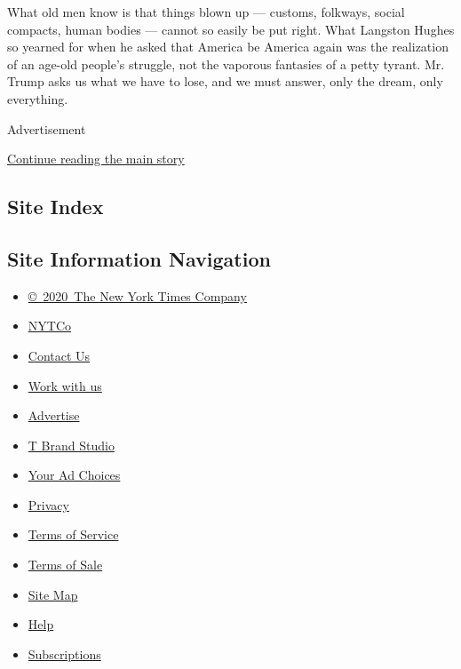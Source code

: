 What old men know is that things blown up --- customs, folkways, social
compacts, human bodies --- cannot so easily be put right. What Langston
Hughes so yearned for when he asked that America be America again was
the realization of an age-old people's struggle, not the vaporous
fantasies of a petty tyrant. Mr. Trump asks us what we have to lose, and
we must answer, only the dream, only everything.

Advertisement

\protect\hyperlink{after-bottom}{Continue reading the main story}

\hypertarget{site-index}{%
\subsection{Site Index}\label{site-index}}

\hypertarget{site-information-navigation}{%
\subsection{Site Information
Navigation}\label{site-information-navigation}}

\begin{itemize}
\tightlist
\item
  \href{https://help.nytimes.com/hc/en-us/articles/115014792127-Copyright-notice}{©~2020~The
  New York Times Company}
\end{itemize}

\begin{itemize}
\tightlist
\item
  \href{https://www.nytco.com/}{NYTCo}
\item
  \href{https://help.nytimes.com/hc/en-us/articles/115015385887-Contact-Us}{Contact
  Us}
\item
  \href{https://www.nytco.com/careers/}{Work with us}
\item
  \href{https://nytmediakit.com/}{Advertise}
\item
  \href{http://www.tbrandstudio.com/}{T Brand Studio}
\item
  \href{https://www.nytimes.com/privacy/cookie-policy\#how-do-i-manage-trackers}{Your
  Ad Choices}
\item
  \href{https://www.nytimes.com/privacy}{Privacy}
\item
  \href{https://help.nytimes.com/hc/en-us/articles/115014893428-Terms-of-service}{Terms
  of Service}
\item
  \href{https://help.nytimes.com/hc/en-us/articles/115014893968-Terms-of-sale}{Terms
  of Sale}
\item
  \href{https://spiderbites.nytimes.com}{Site Map}
\item
  \href{https://help.nytimes.com/hc/en-us}{Help}
\item
  \href{https://www.nytimes.com/subscription?campaignId=37WXW}{Subscriptions}
\end{itemize}

